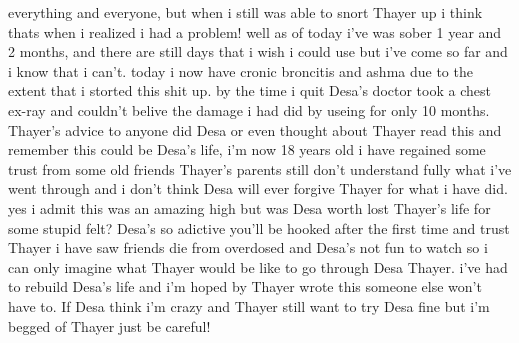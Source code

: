 \documentclass[12pt]{book}
\begin{document}
everything and everyone, but when i still was able to snort Thayer up i think thats when i realized i had a problem! well as of today i've was sober 1 year and 2 months, and there are still days that i wish i could use but i've come so far and i know that i can't. today i now have cronic broncitis and ashma due to the extent that i storted this shit up. by the time i quit Desa's doctor took a chest ex-ray and couldn't belive the damage i had did by useing for only 10 months. Thayer's advice to anyone did Desa or even thought about Thayer read this and remember this could be Desa's life, i'm now 18 years old i have regained some trust from some old friends Thayer's parents still don't understand fully what i've went through and i don't think Desa will ever forgive Thayer for what i have did. yes i admit this was an amazing high but was Desa worth lost Thayer's life for some stupid felt? Desa's so adictive you'll be hooked after the first time and trust Thayer i have saw friends die from overdosed and Desa's not fun to watch so i can only imagine what Thayer would be like to go through Desa Thayer. i've had to rebuild Desa's life and i'm hoped by Thayer wrote this someone else won't have to. If Desa think i'm crazy and Thayer still want to try Desa fine but i'm begged of Thayer just be careful!
\end{document}
